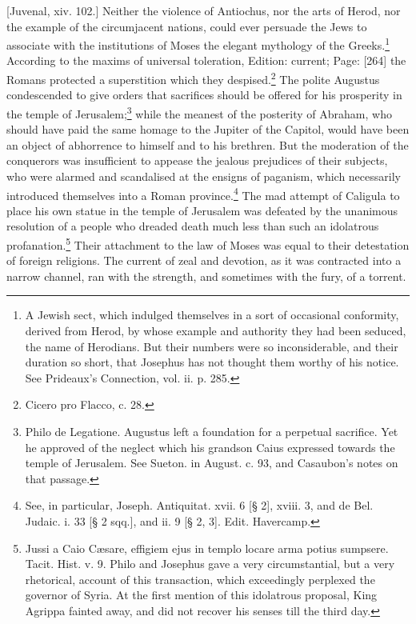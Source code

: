 {[Juvenal, xiv. 102.]} Neither the violence of Antiochus, nor the arts of Herod, nor the example of the circumjacent nations, could ever persuade the Jews to associate with the institutions of Moses the elegant mythology of the Greeks.\footnote{A Jewish sect, which indulged themselves in a sort of occasional conformity, derived from Herod, by whose example and authority they had been seduced, the name of Herodians. But their numbers were so inconsiderable, and their duration so short, that Josephus has not thought them worthy of his notice. See Prideaux\texthebrew{}’s Connection, vol. ii. p. 285.} According to the maxims of universal toleration, Edition: current; Page: [264] the Romans protected a superstition which they despised.\footnote{Cicero pro Flacco, c. 28.} The polite Augustus condescended to give orders that sacrifices should be offered for his prosperity in the temple of Jerusalem;\footnote{Philo de Legatione. Augustus left a foundation for a perpetual sacrifice. Yet he approved of the neglect which his grandson Caius expressed towards the temple of Jerusalem. See Sueton. in August. c. 93, and Casaubon\texthebrew{}’s notes on that passage.} while the meanest of the posterity of Abraham, who should have paid the same homage to the Jupiter of the Capitol, would have been an object of abhorrence to himself and to his brethren. But the moderation of the conquerors was insufficient to appease the jealous prejudices of their subjects, who were alarmed and scandalised at the ensigns of paganism, which necessarily introduced themselves into a Roman province.\footnote{See, in particular, Joseph. Antiquitat. xvii. 6 [§ 2], xviii. 3, and de Bel. Judaic. i. 33 [§ 2 sqq.], and ii. 9 [§ 2, 3]. Edit. Havercamp.} The mad attempt of Caligula to place his own statue in the temple of Jerusalem was defeated by the unanimous resolution of a people who dreaded death much less than such an idolatrous profanation.\footnote{Jussi a Caio Cæsare, effigiem ejus in templo locare arma potius sumpsere. Tacit. Hist. v. 9. Philo and Josephus gave a very circumstantial, but a very rhetorical, account of this transaction, which exceedingly perplexed the governor of Syria. At the first mention of this idolatrous proposal, King Agrippa fainted away, and did not recover his senses till the third day.} Their attachment to the law of Moses was equal to their detestation of foreign religions. The current of zeal and devotion, as it was contracted into a narrow channel, ran with the strength, and sometimes with the fury, of a torrent.

